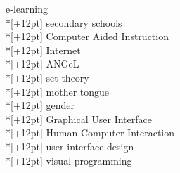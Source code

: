 

\vspace{12pt}

e-learning\\*[+12pt]
secondary schools\\*[+12pt]
Computer Aided Instruction\\*[+12pt]
Internet\\*[+12pt]
ANGeL\\*[+12pt]
set theory\\*[+12pt]
mother tongue\\*[+12pt]
gender\\*[+12pt]
Graphical User Interface\\*[+12pt]
Human Computer Interaction\\*[+12pt]
user interface design\\*[+12pt]
visual programming

